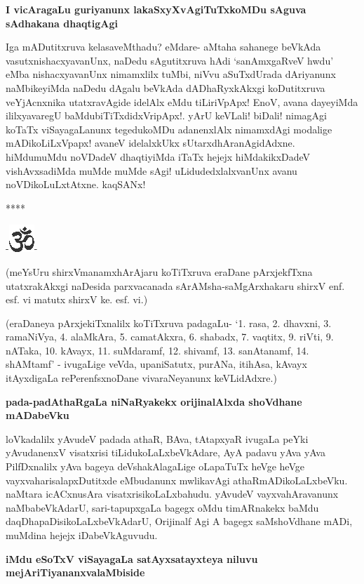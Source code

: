 {\bf I vicAragaLu guriyanunx lakaSxyXvAgiTuTxkoMDu sAguva sAdhakana dhaqtigAgi}

Iga mADutitxruva kelasaveMthadu? eMdare- aMtaha sahanege beVkAda vasutxnishacxyavanUnx, naDedu sAgutitxruva hAdi `sanAmxgaRveV hwdu' eMba nishacxyavanUnx nimamxlilx tuMbi, niVvu aSuTxdUrada dAriyanunx naMbikeyiMda naDedu dAgalu beVkAda dADhaRyxkAkxgi koDutitxruva veYjAcnxnika utatxravAgide idelAlx eMdu tiLiriVpApx! EnoV, avana dayeyiMda ililxyavaregU baMdubiTiTxdidxVripApx!. yArU keVLali! biDali! nimagAgi koTaTx viSayagaLanunx tegedukoMDu adanenxlAlx nimamxdAgi modalige mADikoLiLxVpapx! avaneV idelalxkUkx sUtarxdhAranAgidAdxne. hiMdumuMdu noVDadeV dhaqtiyiMda iTaTx hejejx hiMdakikxDadeV vishAvxsadiMda muMde muMde sAgi! uLidudedxlalxvanUnx avanu noVDikoLuLxtAtxne. kaqSANx!

\begin{center}
****
\end{center}

\begin{center}
-\includegraphics{om.eps}-
\end{center}

(meYsUru shirxVmanamxhArAjaru koTiTxruva eraDane pArxjekfTxna utatxrakAkxgi naDesida parxvacanada sArAMsha-saMgArxhakaru shirxV enf. esf. vi matutx shirxV ke. esf. vi.)

(eraDaneya pArxjekiTxnalilx koTiTxruva padagaLu- `1. rasa, 2. dhavxni, 3. ramaNiVya, 4. alaMkAra, 5. camatAkxra, 6. shabadx, 7. vaqtitx, 9. riVti, 9. nATaka, 10. kAvayx, 11. suMdaramf, 12. shivamf, 13. sanAtanamf, 14. shAMtamf' - ivugaLige veVda, upaniSatutx, purANa, itihAsa, kAvayx itAyxdigaLa rePerenfsxnoDane vivaraNeyanunx keVLidAdxre.)

{\bf pada-padAthaRgaLa niNaRyakekx orijinalAlxda shoVdhane mADabeVku}

loVkadalilx yAvudeV padada athaR, BAva, tAtapxyaR ivugaLa peYki yAvudanenxV visatxrisi tiLidukoLaLxbeVkAdare, AyA padavu yAva yAva PilfDxnalilx yAva bageya deVshakAlagaLige oLapaTuTx heVge heVge vayxvaharisalapxDutitxde eMbudanunx mwlikavAgi athaRmADikoLaLxbeVku. naMtara icACxnusAra visatxrisikoLaLxbahudu. yAvudeV vayxvahAravanunx naMbabeVkAdarU, sari-tapupxgaLa bagegx oMdu timARnakekx baMdu daqDhapaDisikoLaLxbeVkAdarU, Orijinalf Agi A bagegx saMshoVdhane mADi, muMdina hejejx iDabeVkAguvudu.

{\bf iMdu eSoTxV viSayagaLa satAyxsatayxteya niluvu mejAriTiyananxvalaMbiside}

